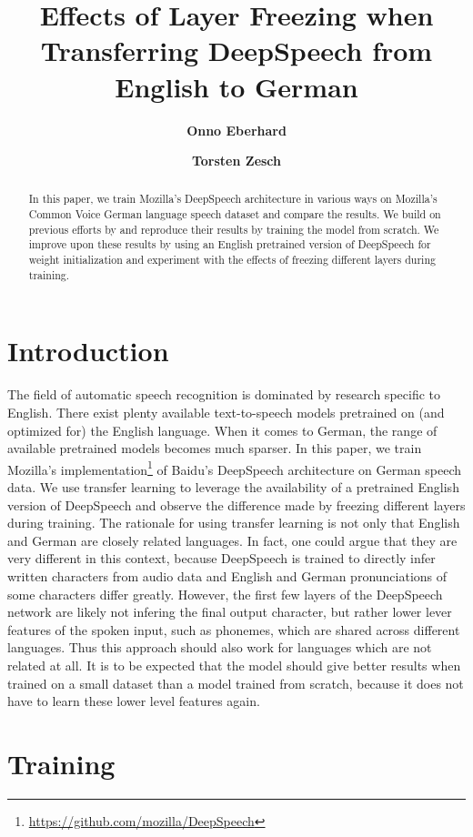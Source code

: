 \documentclass[12pt]{article}    %
\title{Effects of Layer Freezing when Transferring DeepSpeech from English to German}
\author[1]{\textbf{Onno Eberhard}}
\author[ ]{\textbf{Torsten Zesch}}
\affil[ ]{Language Technology Lab}
\affil[ ]{University of Duisburg-Essen}
\affil[1]{\href{mailto:onno.eberhard@stud.uni-due.de}{\texttt{onno.eberhard@stud.uni-due.de}}}
\date{}
\begin{document}
\maketitle

\begin{abstract}\noindent
In this paper, we train Mozilla's DeepSpeech architecture in various ways on Mozilla's Common Voice German language speech dataset and compare the results. We build on previous efforts by \textcite{agarwal-zesch-2019-german} and reproduce their results by training the model from scratch. We improve upon these results by using an English pretrained version of DeepSpeech for weight initialization and experiment with the effects of freezing different layers during training.
\end{abstract}

\section{Introduction}
The field of automatic speech recognition is dominated by research specific to English. There exist plenty available text-to-speech models pretrained on (and optimized for) the English language. When it comes to German, the range of available pretrained models becomes much sparser. In this paper, we train Mozilla's implementation\footnote{\url{https://github.com/mozilla/DeepSpeech}} of Baidu's DeepSpeech architecture \parencite{hannun2014deep} on German speech data. We use transfer learning to leverage the availability of a pretrained English version of DeepSpeech and observe the difference made by freezing different layers during training. The rationale for using transfer learning is not only that English and German are closely related languages. In fact, one could argue that they are very different in this context, because DeepSpeech is trained to directly infer written characters from audio data and English and German pronunciations of some characters differ greatly. However, the first few layers of the DeepSpeech network are likely not infering the final output character, but rather lower lever features of the spoken input, such as phonemes, which are shared across different languages. Thus this approach should also work for languages which are not related at all. It is to be expected that the model should give better results when trained on a small dataset than a model trained from scratch, because it does not have to learn these lower level features again.

\section{Training}
\end{document}
